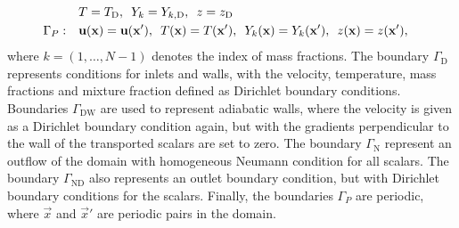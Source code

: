 \begin{subequations}
\begin{align}
		\,\,\,\notag                                                                                                                                                                                                \\
		 & T = T_{\text{D}},
		\,\,\,
		Y_{k} =  Y_{k,{\text{D}}},
		\,\,\,
		z = z_{\text{D}}
		\label{eq:bc_OD}                                                                                                                                                                                            \\
		\Gamma_{P}:\quad
		 & \vec{u}(\vec{x}) = \vec{u}(\vec{x}'),
		\,\,\,
		T(\vec{x}) = T(\vec{x}'),
		\,\,\,
		Y_{k}(\vec{x}) =  Y_{k}(\vec{x}'),
		\,\,\,
		z(\vec{x}) = z(\vec{x}'),
		\label{eq:bc_P}
	\end{align}
\end{subequations}
where $k = (1,\dots,N-1)$ denotes the index of mass fractions. The boundary $\Gamma_\text{D}$ represents conditions for inlets and walls, with the velocity, temperature, mass fractions and mixture fraction defined as Dirichlet boundary conditions. Boundaries $\Gamma_\text{DW}$  are used to represent adiabatic walls, where the velocity is given as a Dirichlet boundary condition again, but with the gradients perpendicular to the wall of the transported scalars are set to zero. The boundary $\Gamma_\text{N}$ represent an outflow of the domain with homogeneous Neumann condition for all scalars. The boundary $\Gamma_{\text{ND}}$ also  represents an outlet boundary condition, but with Dirichlet boundary conditions for the scalars. Finally, the boundaries $\Gamma_P$ are periodic, where $\vec{x}$ and $\vec{x}'$ are periodic pairs in the domain.